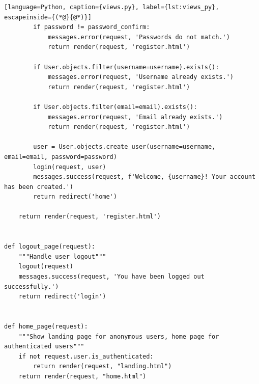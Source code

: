 \begin{lstlisting}[language=Python, caption={views.py}, label={lst:views_py}, escapeinside={(*@}{@*)}]
        if password != password_confirm:
            messages.error(request, 'Passwords do not match.')
            return render(request, 'register.html')
        
        if User.objects.filter(username=username).exists():
            messages.error(request, 'Username already exists.')
            return render(request, 'register.html')
        
        if User.objects.filter(email=email).exists():
            messages.error(request, 'Email already exists.')
            return render(request, 'register.html')
        
        user = User.objects.create_user(username=username, email=email, password=password)
        login(request, user)
        messages.success(request, f'Welcome, {username}! Your account has been created.')
        return redirect('home')
    
    return render(request, 'register.html')


def logout_page(request):
    """Handle user logout"""
    logout(request)
    messages.success(request, 'You have been logged out successfully.')
    return redirect('login')


def home_page(request):
    """Show landing page for anonymous users, home page for authenticated users"""
    if not request.user.is_authenticated:
        return render(request, "landing.html")
    return render(request, "home.html")



\end{lstlisting}
